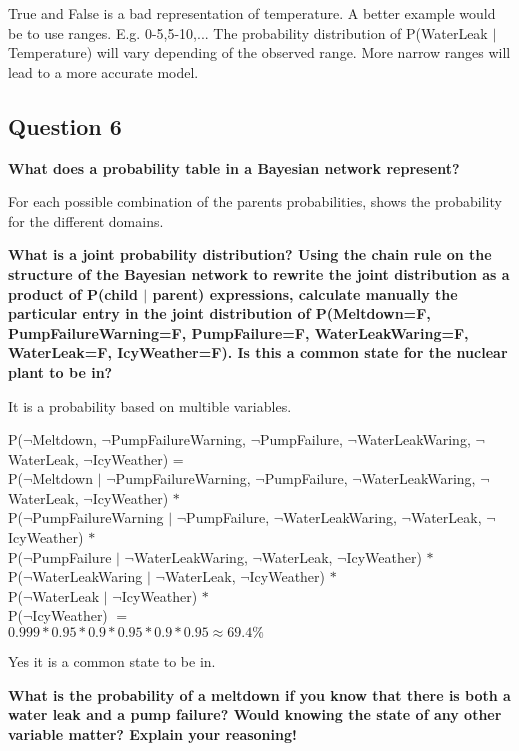\documentclass[12pt,a4paper]{article}
\begin{document}
True and False is a bad representation of temperature. A better example would be to use ranges. E.g. 0-5,5-10,... The probability distribution of P(WaterLeak $|$ Temperature) will vary depending of the observed range. More narrow ranges will lead to a more accurate model.

\subsection{Question 6}
\textbf{What does a probability table in a Bayesian network represent?}

For each possible combination of the parents probabilities, shows the probability for the different domains. 

\textbf{What is a joint probability distribution? Using the chain rule on the structure of the Bayesian network to rewrite the joint distribution as a product of P(child $|$ parent) expressions, calculate manually the particular entry in the joint distribution of P(Meltdown=F, PumpFailureWarning=F, PumpFailure=F, WaterLeakWaring=F, WaterLeak=F, IcyWeather=F). Is this a common state for the nuclear plant to be in?}

It is a probability based on multible variables. 

P($\lnot$Meltdown, $\lnot$PumpFailureWarning, $\lnot$PumpFailure, $\lnot$WaterLeakWaring, $\lnot$WaterLeak, $\lnot$IcyWeather) = \\ P($\lnot$Meltdown $|$ $\lnot$PumpFailureWarning, $\lnot$PumpFailure, $\lnot$WaterLeakWaring, $\lnot$WaterLeak, $\lnot$IcyWeather) $*$ \\ P($\lnot$PumpFailureWarning $|$ $\lnot$PumpFailure, $\lnot$WaterLeakWaring, $\lnot$WaterLeak, $\lnot$IcyWeather) $*$ \\ P($\lnot$PumpFailure $|$ $\lnot$WaterLeakWaring, $\lnot$WaterLeak, $\lnot$IcyWeather) $*$ \\ P($\lnot$WaterLeakWaring $|$ $\lnot$WaterLeak, $\lnot$IcyWeather) $*$ \\ 
P($\lnot$WaterLeak $|$ $\lnot$IcyWeather) $*$ \\ P($\lnot$IcyWeather) $=$ \\ 
$0.999 * 0.95 * 0.9 * 0.95 * 0.9 * 0.95 \approx 69.4\%$

Yes it is a common state to be in.

\textbf{What is the probability of a meltdown if you know that there is both a water leak and a pump failure? Would knowing the state of any other variable matter? Explain your reasoning!}
\end{document}
